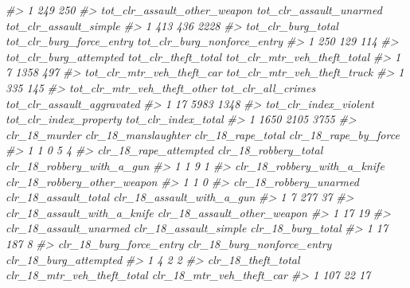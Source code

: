 \documentclass[
  12pt,
]{book}
\newenvironment{Shaded}{\begin{snugshade}}{\end{snugshade}}
\newcommand{\CommentTok}[1]{\textcolor[rgb]{0.37,0.37,0.37}{\textit{#1}}}
\begin{document}
\begin{Shaded}
\begin{Highlighting}[]
\CommentTok{\#> 1                        249                          250}
\CommentTok{\#>   tot\_clr\_assault\_other\_weapon tot\_clr\_assault\_unarmed tot\_clr\_assault\_simple}
\CommentTok{\#> 1                          413                     436                   2228}
\CommentTok{\#>   tot\_clr\_burg\_total tot\_clr\_burg\_force\_entry tot\_clr\_burg\_nonforce\_entry}
\CommentTok{\#> 1                250                      129                         114}
\CommentTok{\#>   tot\_clr\_burg\_attempted tot\_clr\_theft\_total tot\_clr\_mtr\_veh\_theft\_total}
\CommentTok{\#> 1                      7                1358                         497}
\CommentTok{\#>   tot\_clr\_mtr\_veh\_theft\_car tot\_clr\_mtr\_veh\_theft\_truck}
\CommentTok{\#> 1                       335                         145}
\CommentTok{\#>   tot\_clr\_mtr\_veh\_theft\_other tot\_clr\_all\_crimes tot\_clr\_assault\_aggravated}
\CommentTok{\#> 1                          17               5983                       1348}
\CommentTok{\#>   tot\_clr\_index\_violent tot\_clr\_index\_property tot\_clr\_index\_total}
\CommentTok{\#> 1                  1650                   2105                3755}
\CommentTok{\#>   clr\_18\_murder clr\_18\_manslaughter clr\_18\_rape\_total clr\_18\_rape\_by\_force}
\CommentTok{\#> 1             1                   0                 5                    4}
\CommentTok{\#>   clr\_18\_rape\_attempted clr\_18\_robbery\_total clr\_18\_robbery\_with\_a\_gun}
\CommentTok{\#> 1                     1                    9                         1}
\CommentTok{\#>   clr\_18\_robbery\_with\_a\_knife clr\_18\_robbery\_other\_weapon}
\CommentTok{\#> 1                           1                           0}
\CommentTok{\#>   clr\_18\_robbery\_unarmed clr\_18\_assault\_total clr\_18\_assault\_with\_a\_gun}
\CommentTok{\#> 1                      7                  277                        37}
\CommentTok{\#>   clr\_18\_assault\_with\_a\_knife clr\_18\_assault\_other\_weapon}
\CommentTok{\#> 1                          17                          19}
\CommentTok{\#>   clr\_18\_assault\_unarmed clr\_18\_assault\_simple clr\_18\_burg\_total}
\CommentTok{\#> 1                     17                   187                 8}
\CommentTok{\#>   clr\_18\_burg\_force\_entry clr\_18\_burg\_nonforce\_entry clr\_18\_burg\_attempted}
\CommentTok{\#> 1                       4                          2                     2}
\CommentTok{\#>   clr\_18\_theft\_total clr\_18\_mtr\_veh\_theft\_total clr\_18\_mtr\_veh\_theft\_car}
\CommentTok{\#> 1                107                         22                       17}

\end{Highlighting}
\end{Shaded}
\end{document}
